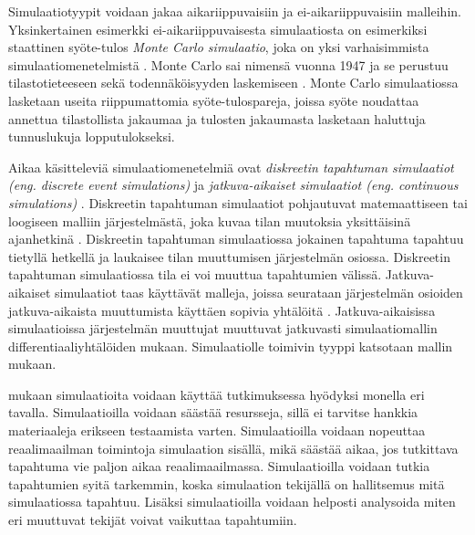 \documentclass[utf8]{gradu3}
\begin{document}
Simulaatiotyypit voidaan jakaa aikariippuvaisiin ja ei-aikariippuvaisiin malleihin.
Yksinkertainen esimerkki ei-aikariippuvaisesta simulaatiosta on esimerkiksi staattinen 
syöte-tulos
\textit{Monte Carlo simulaatio}, joka on yksi varhaisimmista simulaatiomenetelmistä
\parencites%
    {historyOfSimulation1996}%
    {historyOfMonte}
\relax
%
. 
Monte Carlo sai nimensä vuonna 1947 \parencite{historyOfMonte}
ja se perustuu tilastotieteeseen sekä todennäköisyyden laskemiseen
\parencite{historyOfSimulation1996}.
Monte Carlo simulaatiossa lasketaan useita riippumattomia syöte-tulospareja,
joissa syöte noudattaa annettua tilastollista jakaumaa 
ja tulosten jakaumasta lasketaan haluttuja tunnuslukuja lopputulokseksi.

Aikaa käsitteleviä simulaatiomenetelmiä ovat 
\textit{diskreetin tapahtuman simulaatiot (eng. discrete event simulations)}
ja \textit{jatkuva-aikaiset simulaatiot  (eng. continuous simulations)}
\parencite{historyOfSimulation1996}.
Diskreetin tapahtuman simulaatiot pohjautuvat matemaattiseen tai loogiseen
malliin järjestelmästä, joka kuvaa tilan muutoksia yksittäisinä ajanhetkinä
\parencite{historyOfSimulation1996}. 
Diskreetin tapahtuman simulaatiossa jokainen tapahtuma tapahtuu tietyllä 
hetkellä ja laukaisee tilan muuttumisen järjestelmän osiossa.
Diskreetin tapahtuman simulaatiossa tila ei voi muuttua tapahtumien välissä.
Jatkuva-aikaiset simulaatiot taas käyttävät malleja, joissa seurataan 
järjestelmän osioiden jatkuva-aikaista muuttumista käyttäen sopivia 
yhtälöitä \parencite{historyOfSimulation1996}. 
Jatkuva-aikaisissa simulaatioissa järjestelmän muuttujat muuttuvat 
jatkuvasti simulaatiomallin differentiaaliyhtälöiden mukaan.
Simulaatiolle toimivin tyyppi katsotaan mallin mukaan. 

\cite{banks1999introduction} mukaan simulaatioita voidaan 
käyttää tutkimuksessa hyödyksi monella eri tavalla.
Simulaatioilla voidaan säästää resursseja, sillä ei tarvitse hankkia materiaaleja erikseen testaamista varten. 
Simulaatioilla voidaan nopeuttaa reaalimaailman toimintoja simulaation sisällä,
mikä säästää aikaa, jos tutkittava tapahtuma vie paljon aikaa reaalimaailmassa. Simulaatioilla voidaan tutkia tapahtumien syitä tarkemmin, koska simulaation tekijällä on hallitsemus mitä simulaatiossa tapahtuu.
Lisäksi simulaatioilla voidaan helposti analysoida miten eri muuttuvat tekijät voivat vaikuttaa tapahtumiin. 
\end{document}
